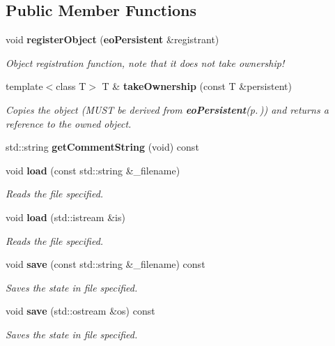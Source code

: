 \subsection*{Public Member Functions}
\begin{CompactItemize}
\item 
void {\bf register\-Object} ({\bf eo\-Persistent} \&registrant)\label{classeo_state_a2}

\begin{CompactList}\small\item\em Object registration function, note that it does not take ownership! \item\end{CompactList}\item 
template$<$class T$>$ T \& {\bf take\-Ownership} (const T \&persistent)
\begin{CompactList}\small\item\em Copies the object (MUST be derived from {\bf eo\-Persistent}{\rm (p.\,\pageref{classeo_persistent})}) and returns a reference to the owned object. \item\end{CompactList}\item 
std::string {\bf get\-Comment\-String} (void) const \label{classeo_state_a4}

\item 
void {\bf load} (const std::string \&\_\-filename)
\begin{CompactList}\small\item\em Reads the file specified. \item\end{CompactList}\item 
void {\bf load} (std::istream \&is)
\begin{CompactList}\small\item\em Reads the file specified. \item\end{CompactList}\item 
void {\bf save} (const std::string \&\_\-filename) const 
\begin{CompactList}\small\item\em Saves the state in file specified. \item\end{CompactList}\item 
void {\bf save} (std::ostream \&os) const 
\begin{CompactList}\small\item\em Saves the state in file specified. \item\end{CompactList}\end{CompactItemize}
